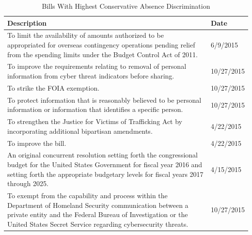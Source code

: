 \begin{table}[h!]
	\centering
	\caption{Bills With Highest Conservative Absence Discrimination}
	\label{lib_bills}
	\begin{tabular}{p{6in}l}
		Description                                                                                                                                                                                                                              & Date       \\
		\midrule
		To limit the availability of amounts authorized to be appropriated for overseas contingency operations pending relief from the spending limits under the Budget Control Act of 2011.                                                     & 6/9/2015   \\
		To improve the requirements relating to removal of personal information from cyber threat indicators before sharing.                                                                                                                     & 10/27/2015 \\
		To strike the FOIA exemption.                                                                                                                                                                                                            & 10/27/2015 \\
		To protect information that is reasonably believed to be personal information or information that identifies a specific person.                                                                                                          & 10/27/2015 \\
		To strengthen the Justice for Victims of Trafficking Act by incorporating additional bipartisan amendments.                                                                                                                              & 4/22/2015  \\
		To improve the bill.                                                                                                                                                                                                                     & 4/22/2015  \\
		An original concurrent resolution setting forth the congressional budget for the United States Government for fiscal year 2016 and setting forth the appropriate budgetary levels for fiscal years 2017 through 2025.                    & 4/15/2015  \\
		To exempt from the capability and process within the Department of Homeland Security communication between a private entity and the Federal Bureau of Investigation or the United States Secret Service regarding cybersecurity threats. & 10/27/2015 \\

\end{tabular}
\end{table}

